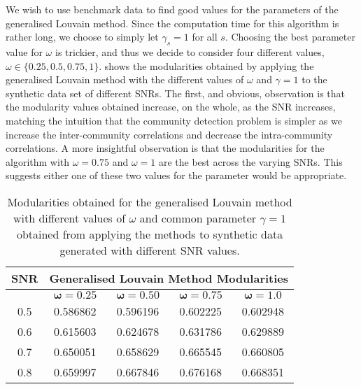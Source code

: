 We wish to use benchmark data to find good values for the parameters of the generalised Louvain method.
Since the computation time for this algorithm is rather long, we choose to simply let $\gamma_{s}=1$ for all $s$.
Choosing the best parameter value for $\omega$ is trickier, and thus we decide to consider four different values, $\omega \in \{ 0.25,0.5,0.75,1 \}$.
 shows the modularities obtained by applying the generalised Louvain method with the different values of $\omega$ and $\gamma=1$ to the synthetic data set of different SNRs.
The first, and obvious, observation is that the modularity values obtained increase, on the whole, as the SNR increases, matching the intuition that the community detection problem is simpler as we increase the inter-community correlations and decrease the intra-community correlations.
A more insightful observation is that the modularities for the algorithm with $\omega=0.75$ and $\omega=1$ are the best across the varying SNRs.
This suggests either one of these two values for the parameter would be appropriate.

\begin{table}[htbp]
  \centering
  \caption{Modularities obtained for the generalised Louvain method with different values of $\omega$ and common parameter $\gamma = 1$ obtained from applying the methods to synthetic data generated with different SNR values.}
    \begin{tabular}{| c | c | c | c | c |}
    \hline
    \textbf{SNR} & \multicolumn{4}{|c|}{\textbf{Generalised Louvain Method Modularities}}\\
    \hline
    & $\bm{\omega = 0.25}$ & $\bm{\omega = 0.50}$ & $\bm{\omega = 0.75}$ & $\bm{\omega = 1.0}$\\
    0.5   & 0.586862 & 0.596196 & 0.602225 & 0.602948 \\
    0.6   & 0.615603 & 0.624678 & 0.631786 & 0.629889 \\
    0.7   & 0.650051 & 0.658629 & 0.665545 & 0.660805 \\
    0.8   & 0.659997 & 0.667846 & 0.676168 & 0.668351 \\
    \hline
    \end{tabular}%
  \label{tab:generalisedLouvainMethodModularitiesSyntheticData}%
\end{table}%

